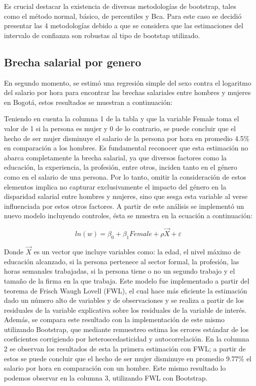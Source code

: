 \documentclass[12pt]{article}
\begin{document}
Es crucial destacar la existencia de diversas metodologías de bootstrap, tales como el método normal, básico, de percentiles y Bca. Para este caso se decidió presentar las 4 metodologías debido a que se considera que las estimaciones del intervalo de confianza son robustas al tipo de bootstap utilizado.


\subsection{Brecha salarial por genero}
En segundo momento, se estimó una regresión simple del sexo contra el logaritmo del salario por hora para encontrar las brechas salariales entre hombres y mujeres en Bogotá, estos resultados se muestran a continuación:



Teniendo en cuenta la columna 1 de la tabla y que la variable Female toma el valor de 1 si la persona es mujer y 0 de lo contrario, se puede concluir que el hecho de ser mujer disminuye el salario de la persona por hora en promedio 4.5\% en comparación a los hombres. Es fundamental reconocer que esta estimación no abarca completamente la brecha salarial, ya que diversos factores como la educación, la experiencia, la profesión, entre otros, inciden tanto en el género como en el salario de una persona. Por lo tanto, omitir la consideración de estos elementos implica no capturar exclusivamente el impacto del género en la disparidad salarial entre hombres y mujeres, sino que sesga esta variable al verse influenciada por estos otros factores. A partir de este análisis se implementó un nuevo modelo incluyendo controles, ésta se muestra en la ecuación a continuación:

$$ln(w)=\beta_0+\beta_1 Female +\rho \Vec{X}+\varepsilon$$

Donde $\Vec{X}$ es un vector que incluye variables como: la edad, el nivel máximo de educación alcanzado, si la persona pertenece al sector formal, la profesión, las horas semanales trabajadas, si la persona tiene o no un segundo trabajo y el tamaño de la firma en la que trabaja. Este modelo fue implementado a partir del teorema de Frisch Waugh Lovell (FWL), el cual hace más eficiente la estimación dado un número alto de variables y de observaciones y se realiza a partir de los residuales de la variable explicativa sobre los residuales de la variable de interés. Además, se compara este resultado con la implementación de este mismo utilizando Bootstrap, que mediante remuestreo estima los errores estándar de los coeficientes corrigiendo por heteroscedasticidad y autocorrelación. En la columna 2 se observan los resultados de esta la primera estimación con FWL; a partir de estos se puede concluir que el hecho de ser mujer disminuye en promedio 9.77\% el salario por hora en comparación con un hombre. Este mismo resultado lo podemos observar en la columna 3, utilizando FWL con Bootstrap.  \\
\end{document}

